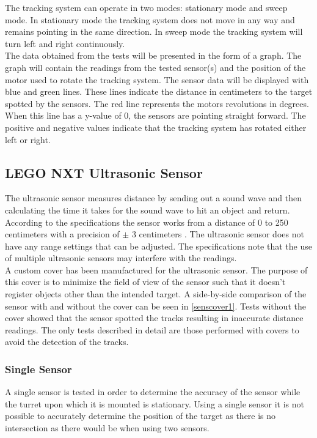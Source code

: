 The tracking system can operate in two modes: stationary mode and sweep mode. In stationary mode the tracking system does not move in any way and remains pointing in the same direction. In sweep mode the tracking system will turn left and right continuously. \\

The data obtained from the tests will be presented in the form of a graph. The graph will contain the readings from the tested sensor(s) and the position of the motor used to rotate the tracking system. The sensor data will be displayed with blue and green lines. These lines indicate the distance in centimeters to the target spotted by the sensors. The red line represents the motors revolutions in degrees. When this line has a y-value of 0, the sensors are pointing straight forward. The positive and negative values indicate that the tracking system has rotated either left or right.

\subsection{LEGO NXT Ultrasonic Sensor}\label{ss:ultrasonic}\label{\automlabel}
The ultrasonic sensor measures distance by sending out a sound wave and then calculating the time it takes for the sound wave to hit an object and return. According to the specifications the sensor works from a distance of 0 to 250 centimeters with a precision of $\pm$ 3 centimeters \cite[p. 29]{legonxtdata}. The ultrasonic sensor does not have any range settings that can be adjusted. The specifications note that the use of multiple ultrasonic sensors may interfere with the readings. \\

A custom cover has been manufactured for the ultrasonic sensor. The purpose of this cover is to minimize the field of view of the sensor such that it doesn't register objects other than the intended target. A side-by-side comparison of the sensor with and without the cover can be seen in \cref{senscover1}. Tests without the cover showed that the sensor spotted the tracks resulting in inaccurate distance readings. The only tests described in detail are those performed with covers to avoid the detection of the tracks.

\vspace{0.01pt}

\subsubsection{Single Sensor}\label{singlesensorult}
A single sensor is tested in order to determine the accuracy of the sensor while the turret upon which it is mounted is stationary. Using a single sensor it is not possible to accurately determine the position of the target as there is no intersection as there would be when using two sensors.

